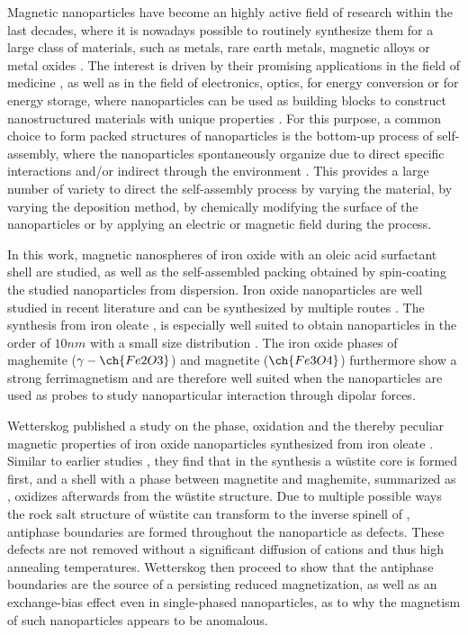 \documentclass[\main/dresen_thesis.tex]{subfiles}
\begin{document}
  Magnetic nanoparticles have become an highly active field of research within the last decades, where it is nowadays possible to routinely synthesize them for a large class of materials, such as metals, rare earth metals, magnetic alloys or metal oxides \cite{Gubin_2005_Magne}.
  The interest is driven by their promising applications in the field of medicine \cite{Thanh_2012_Magne}, as well as in the field of electronics, optics, for energy conversion or for energy storage, where nanoparticles can be used as building blocks to construct nanostructured materials with unique properties \cite{Singamaneni_2011_Magne}.
  For this purpose, a common choice to form packed structures of nanoparticles is the bottom-up process of self-assembly, where the nanoparticles spontaneously organize due to direct specific interactions and/or indirect through the environment \cite{Grzelczak_2010_direc, Whitesides_2002_Selfa}.
  This provides a large number of variety to direct the self-assembly process \ie by varying the material, by varying the deposition method, by chemically modifying the surface of the nanoparticles or by applying an electric or magnetic field during the process.

  In this work, magnetic nanospheres of iron oxide with an oleic acid surfactant shell are studied, as well as the self-assembled packing obtained by spin-coating the studied nanoparticles from dispersion.
  Iron oxide nanoparticles are well studied in recent literature and can be synthesized by multiple routes \cite{Laurent_2008_Magne}.
  The synthesis from iron oleate \cite{Hyeon_2003_Chemi}, is especially well suited to obtain nanoparticles in the order of $10 \unit{nm}$ with a small size distribution \cite{Wetterskog_2014_Preci}.
  The iron oxide phases of maghemite ($\gamma-\ch{Fe2O3}$) and magnetite ($\ch{Fe3O4}$) furthermore show a strong ferrimagnetism and are therefore well suited when the nanoparticles are used as probes to study nanoparticular interaction through dipolar forces.

  Wetterskog \etal published a study on the phase, oxidation and the thereby peculiar magnetic properties of iron oxide nanoparticles synthesized from iron oleate \cite{Wetterskog_2013_Anoma}.
  Similar to earlier studies \cite{Hai_2010_Sizec, Chen_2010_Chara}, they find that in the synthesis a w\"ustite core is formed first, and a shell with a phase between magnetite and maghemite, summarized as , oxidizes afterwards from the w\"ustite structure.
  Due to multiple possible ways the rock salt structure of w\"ustite can transform to the inverse spinell of , antiphase boundaries are formed throughout the nanoparticle as defects.
  These defects are not removed without a significant diffusion of cations \cite{Margulies_1997_Origi} and thus high annealing temperatures.
  Wetterskog \etal then proceed to show that the antiphase boundaries are the source of a persisting reduced magnetization, as well as an exchange-bias effect even in single-phased nanoparticles, as to why the magnetism of such nanoparticles appears to be anomalous.
  \\
\end{document}
